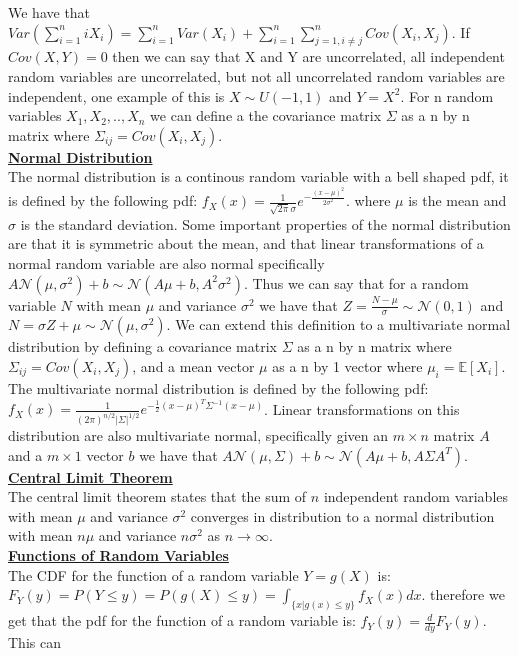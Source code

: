 \documentclass[9.5pt]{article}
\begin{document}
We have that $Var(\sum_{i=1}^n iX_i)=\sum_{i=1}^n Var(X_i)+\sum_{i=1}^n\sum_{j=1, i\neq j}^n Cov(X_i,X_j)$. If 
$Cov(X,Y)=0$ then we can say that X and Y are uncorrelated, all independent 
random variables are uncorrelated, but not all uncorrelated random variables are independent,
one example of this is $X\sim U(-1,1)$ and $Y=X^2$. For 
n random variables $X_1,X_2,..,X_n$ we can define a 
the covariance matrix $\Sigma$ as a n by n matrix where $\Sigma_{ij}=Cov(X_i,X_j)$.\\
\underline{\textbf{Normal Distribution}}\\
The normal distribution is a continous random variable with a bell shaped pdf,
it is defined by the following pdf:
$f_X(x)=\frac{1}{\sqrt{2\pi}\sigma}e^{-\frac{(x-\mu)^2}{2\sigma^2}}$.
where $\mu$ is the mean and $\sigma$ is the standard deviation.
Some important properties of the normal distribution are that it is symmetric about the mean,
and that linear transformations of a normal random variable are also normal specifically
$A\mathcal{N}(\mu,\sigma^2)+b \sim \mathcal{N}(A\mu+b,A^2\sigma^2)$. 
Thus we can say that for a random variable $N$ with mean $\mu$ and variance $\sigma^2$ we have that
$Z=\frac{N-\mu}{\sigma} \sim \mathcal{N}(0,1)$ and $N=\sigma Z + \mu \sim \mathcal{N}(\mu,\sigma^2)$.
We can extend this definition to a multivariate normal distribution by defining a covariance matrix
$\Sigma$ as a n by n matrix where $\Sigma_{ij}=Cov(X_i,X_j)$, and a mean vector $\mu$ as a n by 1 vector
where $\mu_i=\mathbb{E}[X_i]$. The multivariate normal distribution is defined by the following pdf:
$f_X(x)=\frac{1}{(2\pi)^{n/2}|\Sigma|^{1/2}}e^{-\frac{1}{2}(x-\mu)^T\Sigma^{-1}(x-\mu)}$.
Linear transformations on this distribution are also multivariate normal, specifically
given an $m\times n$ matrix $A$ and a $m\times 1$ vector $b$ we have that
$A\mathcal{N}(\mu,\Sigma)+b \sim \mathcal{N}(A\mu+b,A\Sigma A^T)$.\\
\underline{\textbf{Central Limit Theorem}}\\
The central limit theorem states that the sum of $n$ independent random variables
with mean $\mu$ and variance $\sigma^2$ converges in distribution to a normal distribution
with mean $n\mu$ and variance $n\sigma^2$ as $n \rightarrow \infty$. \\
\underline{\textbf{Functions of Random Variables}}\\
The CDF for the function of a random variable $Y=g(X)$ is: $F_Y(y)=P(Y \leq y)=P(g(X) \leq y)=\int_{\{x|g(x)\leq y\}}f_X(x)dx$.
therefore we get that the pdf for the function of a random variable is: $f_Y(y)=\frac{d}{dy}F_Y(y)$. This can 
\end{document}

